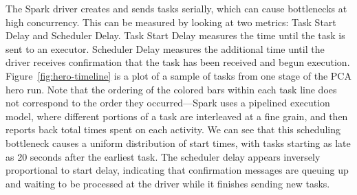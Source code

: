 The Spark driver creates and sends tasks serially, which can cause bottlenecks at high concurrency.  This can be measured by looking at two metrics: Task Start Delay and Scheduler Delay. Task Start Delay measures the time until the  task is sent to an executor. Scheduler Delay measures the additional time until the driver receives confirmation that the task has been received and begun execution. Figure~\ref{fig:hero-timeline} is a plot of a sample of tasks from one stage of the PCA hero run.  Note that the ordering of the colored bars within each task line does not correspond to the order they occurred---Spark uses a pipelined execution model, where different portions of a task are interleaved at a fine grain, and then reports back total times spent on each activity.  We can see that this scheduling bottleneck causes a uniform distribution of start times, with tasks starting as late as 20 seconds after the earliest task.  The scheduler delay appears inversely proportional to start delay, indicating that confirmation messages are queuing up and waiting to be processed at the driver while it finishes sending new tasks.

